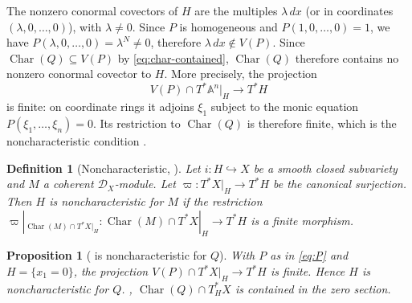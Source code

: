 \documentclass[11pt]{amsart}
\numberwithin{equation}{section}
\newtheorem{proposition}[theorem]{Proposition}
\theoremstyle{plain}
\newtheorem{definition}[theorem]{Definition}
\theoremstyle{remark}
\newcommand{\Char}{\operatorname{Char}}
\begin{document}
\begin{appendix}
The  nonzero conormal covectors of $H$ are the multiples
$\lambda\,dx$ (or in coordinates $(\lambda, 0, \dots,0)$), with $\lambda\ne0$. Since $P$ is homogeneous and
$P(1,0,\ldots,0)=1$, we have $P(\lambda,0,\ldots,0)=\lambda^N\ne0$, therefore $\lambda\,dx \notin V(P)$.
Since $\Char(Q)\subseteq V(P)$ by \eqref{eq:char-contained},
$\Char(Q)$ therefore contains no nonzero conormal covector to $H$. More precisely,
the projection
\[
 V(P)\cap T^*\mathbb A^n|_H\longrightarrow T^*H
\]
is finite: on coordinate rings it adjoins $\xi_1$ subject to the monic
equation $P(\xi_1,\ldots,\xi_n)=0$. Its restriction to $\Char(Q)$ is
therefore finite, which is the noncharacteristic condition
\cite[Definition~15.6]{SchnellNotes}.



\begin{definition}[Noncharacteristic, {\cite[Def.~15.6]{SchnellNotes}}]\label{def:noncar}
Let $i\colon H\hookrightarrow X$ be a smooth closed subvariety and $M$ a
coherent $\mathcal D_X$-module. Let
$\varpi\colon T^*X|_H\to T^*H$ be the canonical surjection. Then $H$ is
\emph{noncharacteristic} for $M$ if the restriction
$\varpi|_{\Char(M)\cap T^*X|_H}\colon\Char(M)\cap T^*X|_H\to T^*H$ is a finite
morphism.
\end{definition}

\begin{proposition}[ is noncharacteristic for $Q$]\label{prop:noncar}
With $P$ as in \eqref{eq:P} and $H=\{x_1=0\}$, the projection
$V(P)\cap T^*X|_H\to T^*H$ is finite. Hence $H$ is noncharacteristic for $Q$.
, $\Char(Q)\cap T^*_HX$ is contained in the zero section.
\end{proposition}


\end{appendix}
\end{document}
